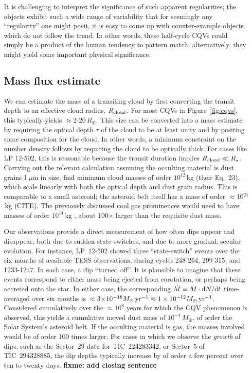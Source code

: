 \documentclass[11pt,twocolumn,tighten]{aastex63}
\begin{document}
It is challenging to interpret the significance of such apparent
regularities;  the objects exhibit such a wide range of variability
that for seemingly any ``regularity'' one might posit, it is easy to
come up with counter-example objects which do not follow the trend.
In other words, these half-cycle CQVs could simply be a product of the
human tendency to pattern match; alternatively, they might yield some
important physical significance.



\subsection{Mass flux estimate}
\label{subsec:massflux}

We can estimate the mass of a transiting cloud by first converting the
transit depth to an effective cloud radius, $R_{\rm cloud}$.  For most
CQVs in Figure~\ref{fig:cqvs}, this typically yields $\approx$2-20\,$R_\oplus$.
This size can be converted into a mass estimate by requiring the
optical depth $\tau$ of the cloud to be at least unity and by positing
some composition for the cloud.  In other
words, a minimum constraint on the number density follows by
requiring the cloud to be optically thick.  For cases like LP 12-502,
this is reasonable because the transit duration implies $R_{\rm
cloud}\ll R_\star$.  Carrying out the relevant calculation assuming
the occulting material is dust grains 1\,$\mu$m in size,
\citet{2023MNRAS.518.4734S} find minimum cloud masses of order
$10^{12}$\,kg (their Eq.~23), which scale linearly with both the
optical depth and dust grain radius.  This is comparable to a
small asteroid; the asteroid belt itself has a mass of
order $\approx$10$^{21}$\,kg (CITE).  
The previously discussed cool gas prominences would need to have
masses of order $10^{14}$\,kg \citep{1990MNRAS.247..415C}, about
100$\times$ larger than the requisite dust mass.

Our observations provide a direct measurement of how often dips
appear and disappear, both due to sudden state-switches, and
due to more gradual, secular evolution.  For instance, LP~12-502
showed three ``state-switch'' events over the six months of available TESS
observations, during cycles 248-264, 299-315, and 1233-1247.  In each
case, a dip ``turned off''.  It is
plausible to imagine that these events correspond to either mass being
ejected from corotation, or perhaps being accreted onto the star.  In
either case, the corresponding $\dot{M} \equiv M\cdot {\rm d}N/{\rm d}t$
time-averaged over six months
is $\approx$3$\times$$10^{-18} M_\odot\,{\rm yr}^{-1} \approx
1\times10^{-12} M_\oplus\,{\rm yr}^{-1}$.  Considered cumulatively
over the $\approx$$10^8$ years for which the CQV phenomenon is
observed, this yields a cumulative moved dust mass of
$10^{-4}\,M_\oplus$, of order the Solar System's asteroid belt.
If the occulting material is gas, the masses involved would be of
order 100 times larger.
For cases in which we observe the {\it growth} of
dips, such as the Sector~29 data for TIC~224283342,
or Sector~5 of TIC~294328885,
the dip depths
typically increase by of order a few percent over ten to twenty days.
{\bf fixme: add closing sentence}
\end{document}
